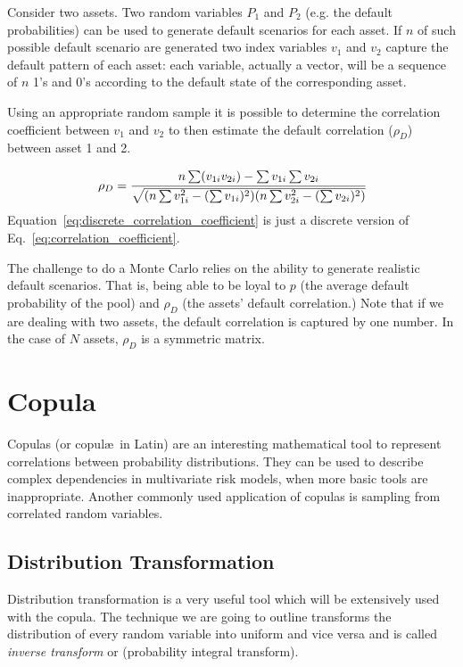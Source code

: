 Consider two assets. Two random variables $P_1$ and $P_2$ (e.g. the default probabilities) can be used to generate default scenarios for each asset. If $n$ of such possible default scenario are generated two index variables $v_1$ and $v_2$ capture the default pattern of each asset: each variable, actually a vector, will be a sequence of $n$ 1’s and 0’s according to the default state of the corresponding asset.

Using an appropriate random sample it is possible to determine the correlation coefficient between $v_1$ and $v_2$ to then estimate the default correlation ($\rho_D$) between asset 1 and 2.

\begin{equation}
\rho_D = \cfrac{n\sum (v_{1i} v_{2i}) - \sum v_{1i} \sum v_{2i}}{\sqrt{(n\sum v_{1i}^2 - (\sum v_{1i})^2)(n\sum v_{2i}^2 - (\sum v_{2i})^2)}}
\label{eq:discrete_correlation_coefficient}
\end{equation}
Equation~\ref{eq:discrete_correlation_coefficient} is just a discrete version of Eq.~\ref{eq:correlation_coefficient}.

The challenge to do a Monte Carlo relies on the ability to generate realistic default scenarios. That is, being able to be loyal to $p$ (the average default probability of the pool) and $\rho_D$ (the assets’ default correlation.) Note that if we are dealing with two assets, the default correlation is captured by one number. In the case of $N$ assets, $\rho_D$ is a symmetric matrix. 

\section{Copula}

Copulas (or copul\ae~in Latin) are an interesting mathematical tool to represent correlations between probability distributions. They can be used to describe complex dependencies in multivariate risk models, when more basic tools are inappropriate. Another commonly used application of copulas is sampling from correlated random variables.

\subsection{Distribution Transformation}
\label{distribution-transformation}

Distribution transformation is a very useful tool which will be extensively used with the copula. The technique we are going to outline transforms the distribution of every random variable into uniform and vice versa and is called \emph{inverse transform} or (probability integral transform).


